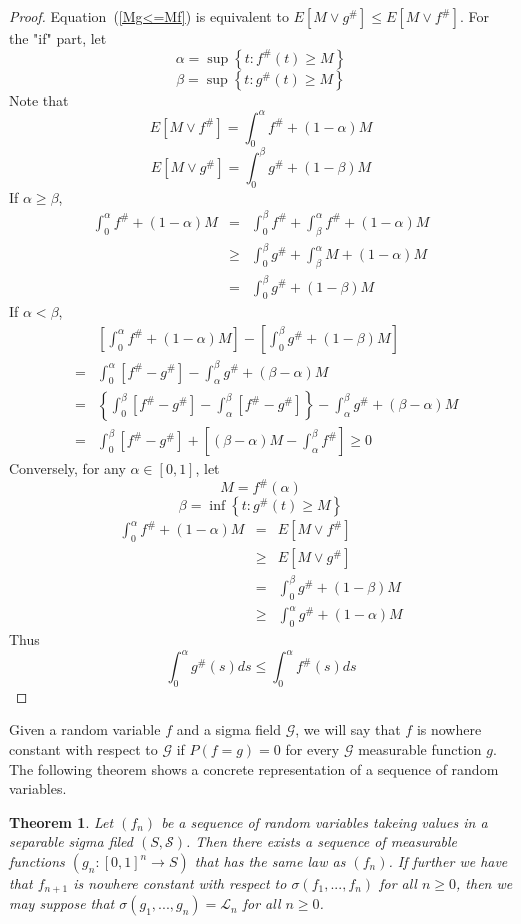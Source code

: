 \documentclass[12pt]{amsart}
\newtheorem{thm}{Theorem}
\begin{document}
\begin{proof}
Equation~(\ref{Mg<=Mf}) is equivalent to
$E \left[ M \vee g^\#  \right] \leq E \left[M \vee f^\# \right]$.
For the "if" part, let
\[\alpha =\sup \left\{t:f^\# (t) \geq M \right\}\]
\[\beta =\sup \left\{t:g^\# (t)\geq M \right\}\]
Note that
\[E \left[ M \vee f^\#\right] =\int_0^\alpha f^\#  + (1-\alpha)M\]
\[E \left[ M \vee g^\# \right]=\int_0^\beta  g^\#  + (1-\beta )M\]
If $\alpha \geq \beta$,
\begin{eqnarray*}
\int_0^\alpha f^\# + (1-\alpha )M
&=& \int_0^\beta f^\# +\int_\beta ^\alpha f^\# +(1-\alpha )M\\
&\geq & \int_0^\beta g^\# +\int_\beta ^\alpha M + (1-\alpha )M\\
&=& \int_0^\beta g^\# + (1-\beta )M
\end{eqnarray*}
If $\alpha <\beta$,
\begin{eqnarray*}
& &\left[ \int_0^\alpha f^\# + (1-\alpha )M
\right] -
\left[\int_0^\beta g^\# + (1-\beta )M\right]\\
&=&\int_0^\alpha \left[f^\# - g^\#
\right] -
\int_\alpha ^\beta g^\# + (\beta -\alpha )M\\
&=&\left\{\int_0^\beta \left[f^\# - g^\# \right] - 
\int_\alpha ^\beta \left[f^\#
- g^\# \right]  \right\}-
 \int_\alpha ^\beta  g^\# + (\beta -\alpha )M\\
&=&\int_0^\beta \left[f^\# - g^\# 
\right] + \left[(\beta -\alpha )M - \int_\alpha ^\beta  f^\# \right] \geq  0
\end{eqnarray*}
Conversely, for any $\alpha \in [0,1]$, let 
\[M=f^\#(\alpha)\]
\[\beta =\inf \left\{t:g^\# (t)\geq M \right\}\]
\begin{eqnarray*}
\int_0^\alpha f^\# + (1-\alpha )M
&=& E \left[ M \vee f^\# \right]\\
&\geq & E \left[M \vee g^\# \right]\\
&= & \int_0^\beta g^\# + (1-\beta )M\\
&\geq &\int_0^\alpha g^\# +(1-\alpha )M
\end{eqnarray*}
Thus
\[\int_0^\alpha g^{\#}(s) ds\leq \int_0^\alpha f^{\#}(s) ds \]
\end{proof}

Given a random variable $f$ and a sigma field $\mathcal{G}$, we
will say that $f$ is nowhere constant with respect to
$\mathcal{G}$ if $P(f=g)=0$ for every $\mathcal{G}$ measurable
function $g$. The following theorem \cite{M2} shows a concrete
representation of a sequence of random variables.

\begin{thm}
\label{t concrete}
Let $(f_n)$ be a sequence of random variables takeing values in a
separable sigma filed $(S,\mathcal{S})$. Then there exists a
sequence of measurable functions $(g_n:[0,1]^{n}\rightarrow S)$
that has the same law as $(f_n)$. If further we have that
$f_{n+1}$ is nowhere constant with respect to
$\sigma(f_1,...,f_n)$ for all $n \geq 0$, then we may suppose that
$\sigma(g_1,...,g_n)=\mathcal{L}_n$ for all $n \geq 0$.
\end{thm}
\end{document}
